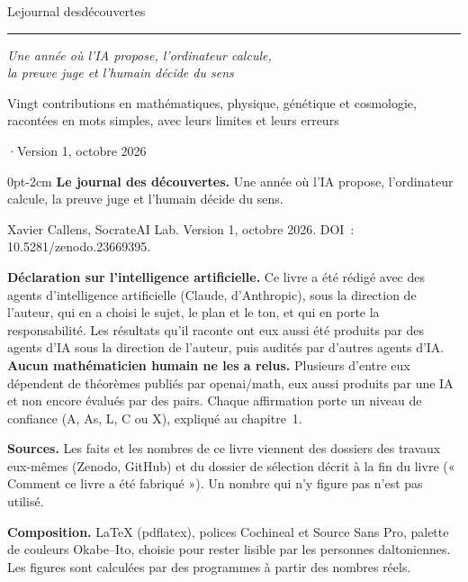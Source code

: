 \thispagestyle{empty}
\vspace*{2.2cm}
{\sffamily\bfseries\footnotesize\color{okbleu}}\par
\vspace{1.4cm}
{\fontsize{34}{38}\selectfont Le\hspace{0.3em}journal des\hspace{0.3em}découvertes\par}
\vspace{0.6cm}
{\color{okorange}\rule{3.2cm}{1.6pt}}\par
\vspace{0.5cm}
{\large\itshape Une année où l'IA propose, l'ordinateur calcule,\\ la preuve juge et l'humain décide du sens\par}
\vspace{1.4cm}
{\normalsize Vingt contributions en mathématiques, physique, génétique et cosmologie,\\
racontées en mots simples, avec leurs limites et leurs erreurs\par}
\vspace*{\fill}
{\sffamily\footnotesize\color{encre!80}\quad·\quad\lfstyle Version 1, octobre 2026\par}
\clearpage

\thispagestyle{empty}
\vspace*{\fill}
\begin{adjustwidth}{0pt}{-2cm}
\small
\noindent\textbf{Le journal des découvertes.} Une année où l'IA propose, l'ordinateur calcule, la preuve juge et
l'humain décide du sens.\par\medskip
\noindent Xavier Callens, SocrateAI Lab. Version 1, octobre 2026. DOI~: 10.5281/zenodo.23669395.\par\medskip
\noindent\textbf{Déclaration sur l'intelligence artificielle.} Ce livre a été rédigé avec des agents d'intelligence
artificielle (Claude, d'Anthropic), sous la direction de l'auteur, qui en a choisi le sujet, le plan et le ton, et qui
en porte la responsabilité. Les résultats qu'il raconte ont eux aussi été produits par des agents d'IA sous la
direction de l'auteur, puis audités par d'autres agents d'IA. \textbf{Aucun mathématicien humain ne les a relus.}
Plusieurs d'entre eux dépendent de théorèmes publiés par openai/math, eux aussi produits par une IA et non encore
évalués par des pairs. Chaque affirmation porte un niveau de confiance (A, As, L, C ou X), expliqué au chapitre~1.\par\medskip
\noindent\textbf{Sources.} Les faits et les nombres de ce livre viennent des dossiers des travaux eux-mêmes
(Zenodo, GitHub) et du dossier de sélection décrit à la fin du livre (« Comment ce livre a été fabriqué »). Un nombre
qui n'y figure pas n'est pas utilisé.\par\medskip
\noindent\textbf{Composition.} \LaTeX{} (pdflatex), polices Cochineal et Source Sans Pro, palette de couleurs
Okabe--Ito, choisie pour rester lisible par les personnes daltoniennes. Les figures sont calculées par des
programmes à partir des nombres réels.
\end{adjustwidth}
\vspace*{1.5cm}
\clearpage
